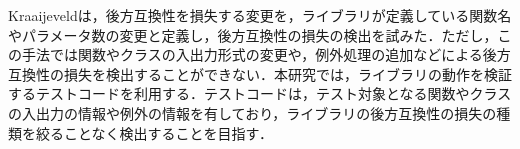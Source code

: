 \documentclass[submit]{ipsj}
\begin{document}
Kraaijeveldは，後方互換性を損失する変更を，ライブラリが定義している関数名やパラメータ数の変更と定義し，後方互換性の損失の検出を試みた\cite{detecting-breaking-changes-in-js-apis}．ただし，この手法では関数やクラスの入出力形式の変更や，例外処理の追加などによる後方互換性の損失を検出することができない．本研究では，ライブラリの動作を検証するテストコードを利用する．テストコードは，テスト対象となる関数やクラスの入出力の情報や例外の情報を有しており，ライブラリの後方互換性の損失の種類を絞ることなく検出することを目指す．



%
%
\end{document}
